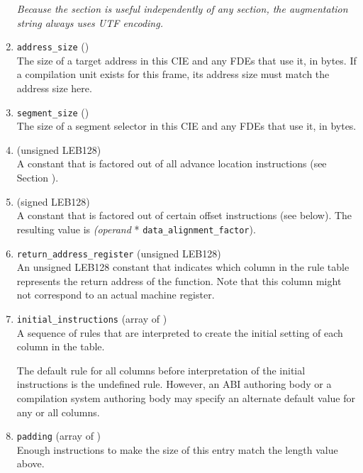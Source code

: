 \begin{enumerate}[1. ]
\textit{Because the \dotdebugframe{} section is useful independently of
any \dotdebuginfo{} section, the augmentation string always uses
UTF encoding.}

\item  \texttt{address\_size} () \\
The size of a target address
in this CIE and any FDEs that
use it, in bytes. If a compilation unit exists for this frame,
its address size must match the address size here.

\item  \texttt{segment\_size} () \\
The 
size of a segment selector in this CIE and any FDEs that
use it, in bytes.

\item  {} (unsigned LEB128) 
 \\
A 
constant that is factored out of all advance location
instructions (see 
Section ).


\item  {} (signed LEB128)
 \\
A 
constant that is factored out of certain offset instructions
(see below). The resulting value is  \textit{(operand} *
\texttt{data\_alignment\_factor}).

\item  \texttt{return\_address\_register} (unsigned LEB128) \\
An unsigned LEB128 constant that indicates which column in the
rule table represents the return address of the function. Note
that this column might not correspond to an actual machine
register.

\item \texttt{initial\_instructions} (array of ) \\
A sequence of rules that are interpreted to create the initial
setting of each column in the table.  

The default rule for
all columns before interpretation of the initial instructions
is the undefined rule. However, an ABI authoring body or a
compilation system authoring body may specify an alternate
default value for any or all columns.

\item \texttt{padding} (array of ) \\
Enough \DWCFAnop{} instructions to make the size of this entry
match the length value above.
\end{enumerate}

